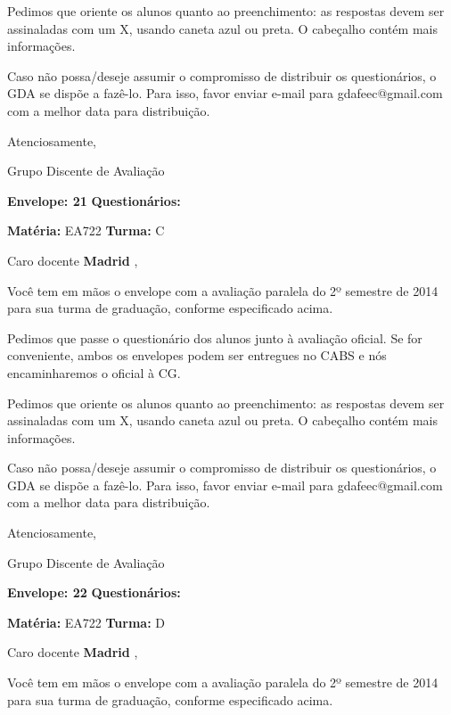 \documentclass[a5paper]{letter}
\begin{document}
Pedimos que oriente os alunos quanto ao preenchimento: as respostas devem ser assinaladas com um X, usando caneta azul ou preta. O cabeçalho contém mais informações.

	Caso não possa/deseje assumir o compromisso de distribuir os questionários, o GDA se dispõe a fazê-lo. Para isso, favor enviar e-mail para gdafeec@gmail.com com a melhor data para distribuição.


Atenciosamente, 

Grupo Discente de Avaliação

\vspace{0.5cm}

{\bf Envelope: 21 }		\hfill	{\bf Questionários:} \hspace{2cm}

\newpage
\thispagestyle{empty}

\hfill {\bf Matéria:} EA722 {\bf Turma:} C

Caro docente {\bf Madrid }, 

	Você tem em mãos o envelope com a avaliação paralela do 2º semestre de 2014 para sua turma de graduação, conforme especificado acima.

	Pedimos que passe o questionário dos alunos junto à avaliação oficial. Se for conveniente, ambos os envelopes podem ser entregues no CABS e nós encaminharemos o oficial à CG.

Pedimos que oriente os alunos quanto ao preenchimento: as respostas devem ser assinaladas com um X, usando caneta azul ou preta. O cabeçalho contém mais informações.

	Caso não possa/deseje assumir o compromisso de distribuir os questionários, o GDA se dispõe a fazê-lo. Para isso, favor enviar e-mail para gdafeec@gmail.com com a melhor data para distribuição.


Atenciosamente, 

Grupo Discente de Avaliação

\vspace{0.5cm}

{\bf Envelope: 22 }		\hfill	{\bf Questionários:} \hspace{2cm}

\newpage
\thispagestyle{empty}

\hfill {\bf Matéria:} EA722 {\bf Turma:} D

Caro docente {\bf Madrid }, 

	Você tem em mãos o envelope com a avaliação paralela do 2º semestre de 2014 para sua turma de graduação, conforme especificado acima.
\end{document}
